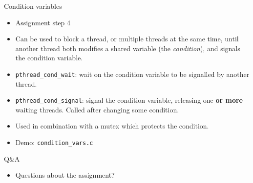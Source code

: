 \documentclass[notes]{beamer}
\begin{document}
\begin{frame}{Condition variables}
    \begin{itemize}
	\item Assignment step 4
	\item Can be used to block a thread, or multiple threads at the same time, until another thread both modifies a shared variable (the \textit{condition}), and signals the condition variable.
	\item \texttt{pthread\_cond\_wait}: wait on the condition variable to be signalled by another thread.
	\item \texttt{pthread\_cond\_signal}: signal the condition variable, releasing one \textbf{or more} waiting threads. Called after changing some condition.
	\item Used in combination with a mutex which protects the condition.
	\item Demo: \texttt{condition\_vars.c}
    \end{itemize}
\end{frame}

\begin{frame}{Q\&A}
    \begin{itemize}
	\item Questions about the assignment?
    \end{itemize}
\end{frame}
\end{document}
